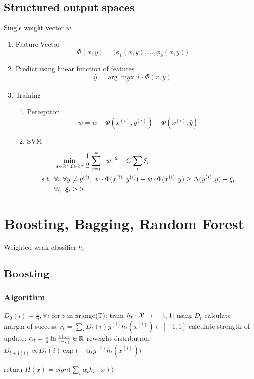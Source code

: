 \documentclass[a4paper]{report}
\begin{document}
\section{Structured output spaces}
Single weight vector $w$. 
\begin{enumerate}
\item Feature Vector
$$
\Phi(x, y) = \big(\phi_1(x,y),...,\phi_k(x, y)\big)
$$
\item Predict using linear function of features 
$$
\hat y = \arg\max_y w\cdot \Phi(x, y)
$$
\item Training 
\begin{enumerate}
\item Perceptron
$$
w = w + \Phi(x^{(i)}, y^{(i)})-\Phi(x^{(i)}, \hat y)
$$

\item SVM
\begin{align*}
&\min_{w \in \mathbb{R}^k, \xi\in \mathbb{R}^n} \frac{1}{2}\sum_{j=1}^k ||w||^2+C\sum_i
\xi_i \\
\text{s.t. } &\forall i, \forall y \neq y^{(i)},~  w\cdot \Phi(x^{(i)}, y^{(i)})-w\cdot \Phi(x^{(i)}, y)\geq \Delta(y^{(i)}, y)-\xi_i \\
& \forall i,~ \xi_i\geq0
\end{align*}
\end{enumerate}
\end{enumerate}

\chapter{Boosting, Bagging, Random Forest}
Weighted weak classifier $h_t$

\section{Boosting}
\subsection{Algorithm}
\begin{python}[mathescape]
$D_0(i)=\frac{1}{n}, \forall i$
for t in xrange(T):
  train $h_t: \mathcal{X}\rightarrow [-1, 1]$ using $D_t$
  calculate margin of success: $r_t=\sum_i D_t(i)y^{(i)}h_t(x^{(i)})\in [-1, 1]$
  calculate strength of update: $\alpha_t = \frac{1}{2}\ln {\frac{1+r_t}{1-r_t}}\in \mathbb{R}$
  reweight distribution: $D_{t+1(i)}\propto D_t(i)\exp\big(-\alpha_t y^{(i)}h_t(x^{(i)})\big)$
  
return $H(x)=sign\Big(\sum_t \alpha_t h_t(x)\Big)$
\end{python}
\end{document}
